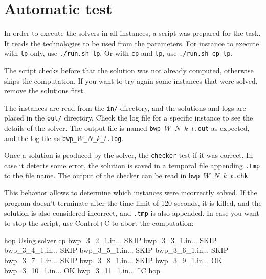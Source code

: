 \documentclass[a4paper]{article}
\begin{document}
\section{Automatic test}

In order to execute the solvers in all instances, a script was prepared for the 
task. It reads the technologies to be used from the parameters. For instance to 
execute with \texttt{lp} only, use \texttt{./run.sh lp}. Or with \texttt{cp} and 
\texttt{lp}, use \texttt{./run.sh cp lp}.

The script checks before that the solution was not already computed, otherwise 
skips the computation. If you want to try again some instances that were solved, 
remove the solutions first.

The instances are read from the \texttt{in/} directory, and the solutions and 
logs are placed in the \texttt{out/} directory. Check the log file for a 
specific instance to see the details of the solver. The output file is named 
\texttt{bwp\_$W$\_$N$\_$k$\_$t$.out} as expected, and the log file as 
\texttt{bwp\_$W$\_$N$\_$k$\_$t$.log}.

Once a solution is produced by the solver, the \texttt{checker} test if it was 
correct. In case it detects some error, the solution is saved in a temporal file 
appending \texttt{.tmp} to the file name. The output of the checker can be read 
in \texttt{bwp\_$W$\_$N$\_$k$\_$t$.chk}.

This behavior allows to determine which instances were incorrectly solved. If 
the program doesn't terminate after the time limit of 120 seconds, it is killed, 
and the solution is also considered incorrect, and \texttt{.tmp} is also 
appended. In case you want to stop the script, use Control+C to abort the 
computation:
%
\begin{textcode}
hop%
Using solver cp
bwp_3_2_1.in... SKIP
bwp_3_3_1.in... SKIP
bwp_3_4_1.in... SKIP
bwp_3_5_1.in... SKIP
bwp_3_6_1.in... SKIP
bwp_3_7_1.in... SKIP
bwp_3_8_1.in... SKIP
bwp_3_9_1.in... OK
bwp_3_10_1.in... OK
bwp_3_11_1.in... ^C
hop%
\end{textcode}
\end{document}
